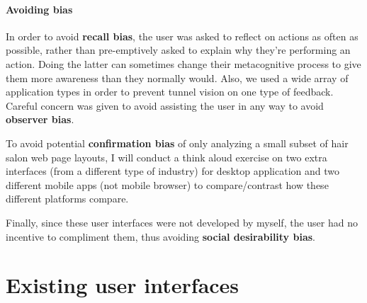 \paragraph{Avoiding bias}
In order to avoid \textbf{recall bias}, the user was asked to reflect on actions as often as possible, rather than pre-emptively asked to explain why they're performing an action. Doing the latter can sometimes change their metacognitive process to give them more awareness than they normally would. Also, we used a wide array of application types in order to prevent tunnel vision on one type of feedback. Careful concern was given to avoid assisting the user in any way to avoid \textbf{observer bias}.

To avoid potential \textbf{confirmation bias} of only analyzing a small subset of hair salon web page layouts, I will conduct a think aloud exercise on two extra interfaces (from a different type of industry) for desktop application and two different mobile apps (not mobile browser) to compare/contrast how these different platforms compare.

Finally, since these user interfaces were not developed by myself, the user had no incentive to compliment them, thus avoiding \textbf{social desirability bias}.


\section{Existing user interfaces}

